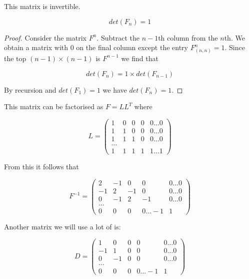This matrix is invertible.

\begin{theorem}
\begin{equation}
det(F_n) = 1
\end{equation}
\end{theorem}
\begin{proof}
Consider the matrix \(F^n\). Subtract the \(n-1\)th column from the \(n\)th. We obtain a matrix with \(0\) on the final column except the entry \(F^n_(n,n) = 1\). Since the top \((n-1) \times (n-1)\) is \(F^{n-1}\) we find that 

\begin{equation}
det(F_n) = 1 \times det(F_{n-1})
\end{equation} 

By recursion and \(det(F_1) = 1\) we have \(det(F_n) = 1\).

\end{proof}

This matrix can be factorised as \(F = LL^T\) where 

\begin{equation}
L = \begin{pmatrix}
 1 & 0 & 0 & 0  & 0 \ldots 0 \\
  1 & 1 & 0 & 0  & 0 \ldots 0\\
     1 & 1 & 1 & 0  & 0 \ldots0  \\
    \ldots  \\
     1 & 1 & 1 & 1  & 1 \ldots 1 
\end{pmatrix}
\end{equation}

From this it follows that

\begin{equation}
F^{-1} = \begin{pmatrix}
 2 & -1 & 0 & 0  & 0 \ldots 0 \\
  -1 & 2 & -1 & 0  & 0 \ldots 0\\
     0 & -1 & 2 & -1  & 0 \ldots0  \\
    \ldots  \\
     0 & 0 & 0 & 0  \ldots -1 & 1 
\end{pmatrix}
\end{equation}

Another matrix we will use a lot of is:

\begin{equation}
D = \begin{pmatrix}
 1 & 0 & 0 & 0  & 0 \ldots 0 \\
  -1 & 1 & 0 & 0  & 0 \ldots 0\\
     0 & -1 & 0 & 0  & 0 \ldots0  \\
    \ldots  \\
     0 & 0 & 0 & 0  \ldots -1 & 1
\end{pmatrix}
\end{equation}

